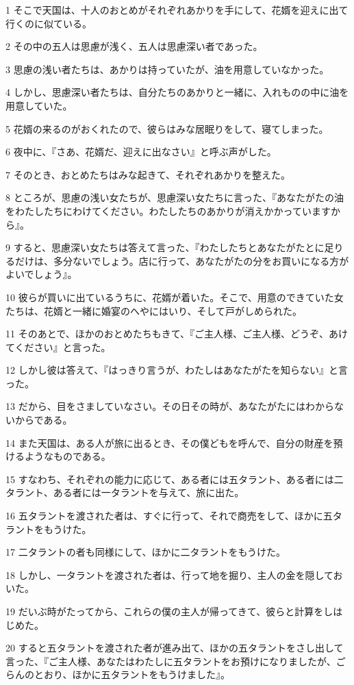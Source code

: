 \par 1 そこで天国は、十人のおとめがそれぞれあかりを手にして、花婿を迎えに出て行くのに似ている。
\par 2 その中の五人は思慮が浅く、五人は思慮深い者であった。
\par 3 思慮の浅い者たちは、あかりは持っていたが、油を用意していなかった。
\par 4 しかし、思慮深い者たちは、自分たちのあかりと一緒に、入れものの中に油を用意していた。
\par 5 花婿の来るのがおくれたので、彼らはみな居眠りをして、寝てしまった。
\par 6 夜中に、『さあ、花婿だ、迎えに出なさい』と呼ぶ声がした。
\par 7 そのとき、おとめたちはみな起きて、それぞれあかりを整えた。
\par 8 ところが、思慮の浅い女たちが、思慮深い女たちに言った、『あなたがたの油をわたしたちにわけてください。わたしたちのあかりが消えかかっていますから』。
\par 9 すると、思慮深い女たちは答えて言った、『わたしたちとあなたがたとに足りるだけは、多分ないでしょう。店に行って、あなたがたの分をお買いになる方がよいでしょう』。
\par 10 彼らが買いに出ているうちに、花婿が着いた。そこで、用意のできていた女たちは、花婿と一緒に婚宴のへやにはいり、そして戸がしめられた。
\par 11 そのあとで、ほかのおとめたちもきて、『ご主人様、ご主人様、どうぞ、あけてください』と言った。
\par 12 しかし彼は答えて、『はっきり言うが、わたしはあなたがたを知らない』と言った。
\par 13 だから、目をさましていなさい。その日その時が、あなたがたにはわからないからである。
\par 14 また天国は、ある人が旅に出るとき、その僕どもを呼んで、自分の財産を預けるようなものである。
\par 15 すなわち、それぞれの能力に応じて、ある者には五タラント、ある者には二タラント、ある者には一タラントを与えて、旅に出た。
\par 16 五タラントを渡された者は、すぐに行って、それで商売をして、ほかに五タラントをもうけた。
\par 17 二タラントの者も同様にして、ほかに二タラントをもうけた。
\par 18 しかし、一タラントを渡された者は、行って地を掘り、主人の金を隠しておいた。
\par 19 だいぶ時がたってから、これらの僕の主人が帰ってきて、彼らと計算をしはじめた。
\par 20 すると五タラントを渡された者が進み出て、ほかの五タラントをさし出して言った、『ご主人様、あなたはわたしに五タラントをお預けになりましたが、ごらんのとおり、ほかに五タラントをもうけました』。
